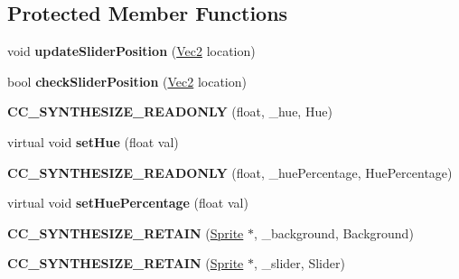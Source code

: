 \subsection*{Protected Member Functions}
\begin{DoxyCompactItemize}
\item 
\mbox{\label{classControlHuePicker_a9789fd6af1788cf5e2be590c1e18ce94}} 
void {\bfseries update\+Slider\+Position} (\hyperlink{classVec2}{Vec2} location)
\item 
\mbox{\label{classControlHuePicker_ad108be7e759b9d14ff54da6d787ee178}} 
bool {\bfseries check\+Slider\+Position} (\hyperlink{classVec2}{Vec2} location)
\item 
\mbox{\label{classControlHuePicker_aa6f70bb12c206d660b035ab5025d6f73}} 
{\bfseries C\+C\+\_\+\+S\+Y\+N\+T\+H\+E\+S\+I\+Z\+E\+\_\+\+R\+E\+A\+D\+O\+N\+LY} (float, \+\_\+hue, Hue)
\item 
\mbox{\label{classControlHuePicker_aac4369e1d82b4974ffa02562777f03aa}} 
virtual void {\bfseries set\+Hue} (float val)
\item 
\mbox{\label{classControlHuePicker_af2569db7be1371cc3da32deab2907153}} 
{\bfseries C\+C\+\_\+\+S\+Y\+N\+T\+H\+E\+S\+I\+Z\+E\+\_\+\+R\+E\+A\+D\+O\+N\+LY} (float, \+\_\+hue\+Percentage, Hue\+Percentage)
\item 
\mbox{\label{classControlHuePicker_a75f320b586469bf92b376cc1510f6249}} 
virtual void {\bfseries set\+Hue\+Percentage} (float val)
\item 
\mbox{\label{classControlHuePicker_adf2a746a2479b13396d6a83e31e21a3f}} 
{\bfseries C\+C\+\_\+\+S\+Y\+N\+T\+H\+E\+S\+I\+Z\+E\+\_\+\+R\+E\+T\+A\+IN} (\hyperlink{classSprite}{Sprite} $\ast$, \+\_\+background, Background)
\item 
\mbox{\label{classControlHuePicker_a1d13f80c98e3f8eefe104ce07197b3d3}} 
{\bfseries C\+C\+\_\+\+S\+Y\+N\+T\+H\+E\+S\+I\+Z\+E\+\_\+\+R\+E\+T\+A\+IN} (\hyperlink{classSprite}{Sprite} $\ast$, \+\_\+slider, Slider)
\item 

\end{DoxyCompactItemize}
